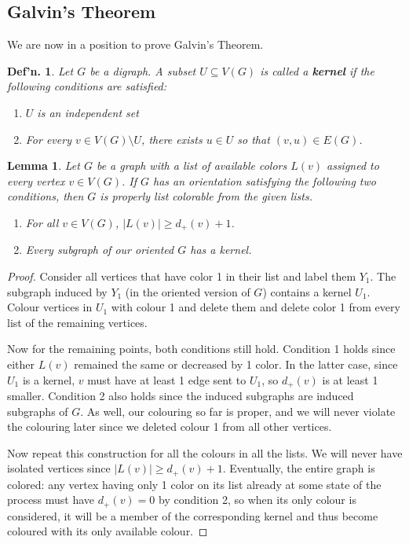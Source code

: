 \documentclass[12pt, a4paper]{book}
\newtheorem{lemma}[theorem]{Lemma}
\newtheorem{definition}[theorem]{Def'n.}
\theoremstyle{nonumberplain}
\newtheorem{proof}{Proof}
\begin{document}
\subsection{Galvin's Theorem}
We are now in a position to prove Galvin's Theorem.
\begin{definition}
    Let $G$ be a digraph.
    A subset $U\subseteq V(G)$ is called a \textbf{kernel} if the following conditions are satisfied:
    \begin{enumerate}[nolistsep]
        \item $U$ is an independent set
        \item For every $v\in V(G)\setminus U$, there exists $u\in U$ so that $(v,u)\in E(G)$.
    \end{enumerate}
\end{definition}
\begin{lemma}
    Let $G$ be a graph with a list of available colors $L(v)$ assigned to every vertex $v\in V(G)$.
    If $G$ has an orientation satisfying the following two conditions, then $G$ is properly list colorable from the given lists.
    \begin{enumerate}[nolistsep]
        \item For all $v\in V(G)$, $|L(v)|\geq d_+(v)+1$.
        \item Every subgraph of our oriented $G$ has a kernel.
    \end{enumerate}
\end{lemma}
\begin{proof}
    Consider all vertices that have color 1 in their list and label them $Y_1$.
    The subgraph induced by $Y_1$ (in the oriented version of $G$) contains a kernel $U_1$.
    Colour vertices in $U_1$ with colour 1 and delete them and delete color 1 from every list of the remaining vertices.

    Now for the remaining points, both conditions still hold.
    Condition 1 holds since either $L(v)$ remained the same or decreased by 1 color.
    In the latter case, since $U_1$ is a kernel, $v$ must have at least 1 edge sent to $U_1$, so $d_+(v)$ is at least 1 smaller.
    Condition 2 also holds since the induced subgraphs are induced subgraphs of $G$.
    As well, our colouring so far is proper, and we will never violate the colouring later since we deleted colour 1 from all other vertices.

    Now repeat this construction for all the colours in all the lists.
    We will never have isolated vertices since $|L(v)|\geq d_+(v)+1$.
    Eventually, the entire graph is colored: any vertex having only 1 color on its list already at some state of the process must have $d_+(v)=0$ by condition 2, so when its only colour is considered, it will be a member of the corresponding kernel and thus become coloured with its only available colour.
\end{proof}
\end{document}
